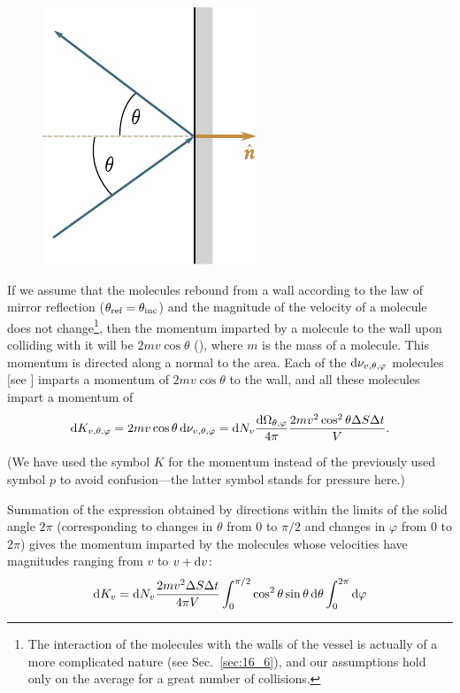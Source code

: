 \begin{figure}[t]
	\begin{center}
		\includegraphics[scale=1.0]{figures/ch_11/fig_11_7.pdf}
		\caption[]{}
		\label{fig:11_7}
	\end{center}
	\vspace{-0.8cm}
\end{figure}

If we assume that the molecules rebound from a wall according to the law of mirror reflection ($\theta_{\text{ref}}=\theta_{\text{inc}}$) and the magnitude of the velocity of a molecule does not change\footnote{The interaction of the molecules with the walls of the vessel is actually of a more complicated nature (see Sec.~\ref{sec:16_6}), and our assumptions hold only on the average for a great number of collisions.}, then the momentum imparted by a molecule to the wall upon colliding with it will be $2mv\cos\theta$ (), where $m$ is the mass of a molecule. This momentum is directed along a normal to the area. Each of the $\mathrm{d}\nu_{v,\theta,\varphi}$ molecules [see ] imparts a momentum of $2mv\cos\theta$ to the wall, and all these molecules impart a momentum of
\begin{equation*}
	\mathrm{d} K_{v,\theta,\varphi} = 2mv\cos\theta\,\mathrm{d}\nu_{v,\theta,\varphi} = \mathrm{d} N_v \frac{\mathrm{d}\Omega_{\theta,\varphi}}{4\pi}\frac{2mv^2\cos^2\theta\Delta S\Delta t}{V}.
\end{equation*}

\noindent
(We have used the symbol $K$ for the momentum instead of the previously used symbol $p$ to avoid confusion---the latter symbol stands for pressure here.)

Summation of the expression obtained by directions within the limits of the solid angle $2\pi$ (corresponding to changes in $\theta$ from $0$ to $\pi/2$ and changes in $\varphi$ from $0$ to $2\pi$) gives the momentum imparted by the molecules whose velocities have magnitudes ranging from $v$ to $v+\mathrm{d} v$:
\begin{equation*}
	\mathrm{d} K_v = \mathrm{d} N_v \frac{2mv^2\Delta S\Delta t}{4\pi V} \int_{0}^{\pi/2}\cos^2\theta\sin\theta\,\mathrm{d}\theta \int_{0}^{2\pi}\mathrm{d}\varphi
\end{equation*}

